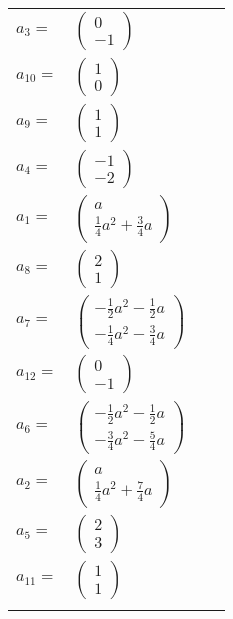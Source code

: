 \documentclass[1p]{elsarticle_modified}
\theoremstyle{definition}
\begin{document}
\begin{tabular}{m{7pt} m{180pt} m{7pt} m{180pt} }
\flushright $a_{3}=$&$\begin{pmatrix}0\\-1\end{pmatrix}$ \\
\flushright $a_{10}=$&$\begin{pmatrix}1\\0\end{pmatrix}$ \\
\flushright $a_{9}=$&$\begin{pmatrix}1\\1\end{pmatrix}$ \\
\flushright $a_{4}=$&$\begin{pmatrix}-1\\-2\end{pmatrix}$ \\
\flushright $a_{1}=$&$\begin{pmatrix}a\\\frac{1}{4} a^2+\frac{3}{4} a\end{pmatrix}$ \\
\flushright $a_{8}=$&$\begin{pmatrix}2\\1\end{pmatrix}$ \\
\flushright $a_{7}=$&$\begin{pmatrix}-\frac{1}{2} a^2-\frac{1}{2} a\\-\frac{1}{4} a^2-\frac{3}{4} a\end{pmatrix}$ \\
\flushright $a_{12}=$&$\begin{pmatrix}0\\-1\end{pmatrix}$ \\
\flushright $a_{6}=$&$\begin{pmatrix}-\frac{1}{2} a^2-\frac{1}{2} a\\-\frac{3}{4} a^2-\frac{5}{4} a\end{pmatrix}$ \\
\flushright $a_{2}=$&$\begin{pmatrix}a\\\frac{1}{4} a^2+\frac{7}{4} a\end{pmatrix}$ \\
\flushright $a_{5}=$&$\begin{pmatrix}2\\3\end{pmatrix}$ \\
\flushright $a_{11}=$&$\begin{pmatrix}1\\1\end{pmatrix}$\\&\end{tabular}
\end{document}
